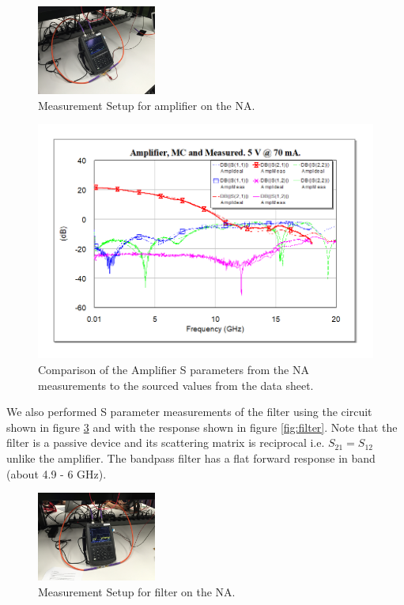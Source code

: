 \documentclass[twocolumn, aps, apl]{revtex4-1}
\begin{document}
\begin{figure}[!htbp]
    \centering
    \includegraphics[width=0.35\textwidth]{amp_measurement.jpeg}
    \caption{Measurement Setup for amplifier on the NA.}
    \label{fig:ampimg}
\end{figure}


\begin{figure}[!htbp]
    \centering
    \includegraphics[scale=0.45]{AmplifierMCandMeasured.png}
    \caption{Comparison of the Amplifier S parameters from the NA measurements to the sourced values from the data sheet.}
    \label{fig:amp}
\end{figure}

We also performed S parameter measurements of the filter using the circuit shown in figure \ref{fig:filterimg} and with the response shown in figure \ref{fig:filter}. Note that the filter is a passive device and its scattering matrix is reciprocal i.e. $S_{21} = S_{12}$ unlike the amplifier. The bandpass filter has a flat forward response in band (about 4.9 - 6 GHz).
\begin{figure}[!htbp]
    \centering
    \includegraphics[width=0.35\textwidth]{filter_measurement.jpeg}
    \caption{Measurement Setup for filter on the NA.}
    \label{fig:filterimg}
\end{figure}
\end{document}
